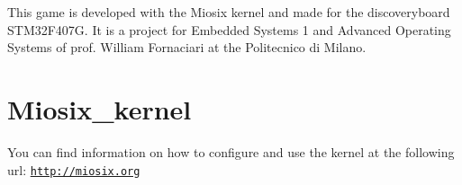 This game is developed with the Miosix kernel and made for the discoveryboard S\+T\+M32\+F407G. It is a project for Embedded Systems 1 and Advanced Operating Systems of prof. William Fornaciari at the Politecnico di Milano.

\section*{Miosix\+\_\+kernel}

You can find information on how to configure and use the kernel at the following url\+: \href{http://miosix.org}{\tt http\+://miosix.\+org} 